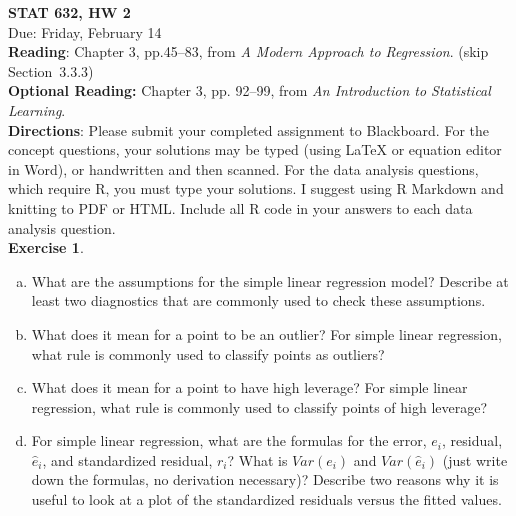 \documentclass[11pt]{article}\usepackage[]{graphicx}\usepackage[]{color}
\begin{document}
\setlength\parindent{0pt}

\textbf{STAT 632, HW 2}\\
Due: Friday, February 14\\

\textbf{Reading}: Chapter 3, pp.45--83, from \emph{A Modern Approach to Regression}. (skip Section~3.3.3)\\
\textbf{Optional Reading:} Chapter 3, pp. 92--99, from \emph{An Introduction to Statistical Learning}.\\

\textbf{Directions}:  Please submit your completed assignment to Blackboard.  For the concept questions, your solutions may be typed (using LaTeX or equation editor in Word), or handwritten and then scanned.  For the data analysis questions, which require R, you must type your solutions.  I suggest using R Markdown and knitting to PDF or HTML.  Include all R code in your answers to each data analysis question.\\

\textbf{Exercise 1}. 
\begin{enumerate}[(a)]
\item What are the assumptions for the simple linear regression model?  Describe at least two diagnostics that are commonly used to check these assumptions.  
\item What does it mean for a point to be an outlier?  For simple linear regression, what rule is commonly used to classify points as outliers?
\item What does it mean for a point to have high leverage?  For simple linear regression, what rule is commonly used to classify points of high leverage?
\item For simple linear regression, what are the formulas for the error, $e_i$, residual, $\hat{e}_i$, and standardized residual, $r_i$?  What is $Var(e_i)$ and $Var(\hat{e}_i)$ (just write down the formulas, no derivation necessary)?  Describe two reasons why it is useful to look at a plot of the standardized residuals versus the fitted values.\\
\end{enumerate}
\end{document}
